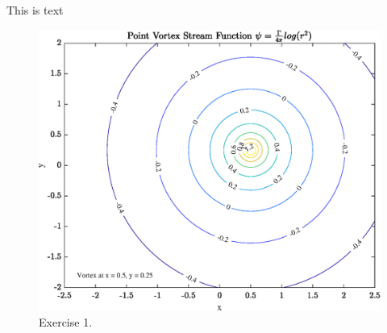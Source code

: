 



\justify
This is text
\begin{figure}[htbp]
\centering
\includegraphics[scale=0.8]{Exercise_1_Contourplot.eps}
\caption{Exercise 1.}
\label{Exercise 1 streamfunction contour plot}
\end{figure}